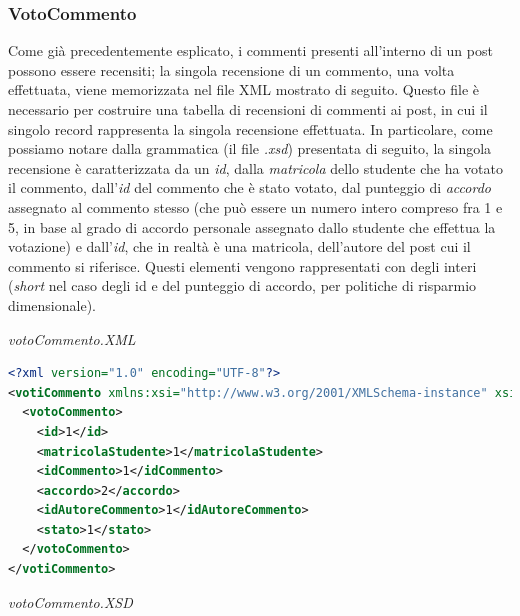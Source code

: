 \documentclass [a4paper,11pt]{book}
\begin{document}
\medskip

\subsubsection{VotoCommento}

Come già precedentemente esplicato, i commenti presenti all'interno di un post possono essere recensiti; la singola recensione di un commento, una volta effettuata, viene memorizzata nel file XML mostrato di seguito. Questo file è necessario per costruire una tabella di recensioni di commenti ai post, in cui il singolo record rappresenta la singola recensione effettuata. In particolare, come possiamo notare dalla grammatica (il file \emph{.xsd}) presentata di seguito, la singola recensione è caratterizzata da un \emph{id}, dalla \emph{matricola} dello studente che ha votato il commento, dall'\emph{id} del commento che è stato votato, dal punteggio di \emph{accordo} assegnato al commento stesso (che può essere un numero intero compreso fra 1 e 5, in base al grado di accordo personale assegnato dallo studente che effettua la votazione) e dall'\emph{id}, che in realtà è una matricola, dell'autore del post cui il commento si riferisce. Questi elementi vengono rappresentati con degli interi (\emph{short} nel caso degli id e del punteggio di accordo, per politiche di risparmio dimensionale).

\medskip

\emph{votoCommento.XML}

\label{sec:votoCommento}

\begin{lstlisting}[language=XML]
<?xml version="1.0" encoding="UTF-8"?>
<votiCommento xmlns:xsi="http://www.w3.org/2001/XMLSchema-instance" xsi:noNamespaceSchemaLocation="votoCommento.xsd">
  <votoCommento>
    <id>1</id>
    <matricolaStudente>1</matricolaStudente>
    <idCommento>1</idCommento>
    <accordo>2</accordo>
    <idAutoreCommento>1</idAutoreCommento>
    <stato>1</stato>
  </votoCommento>
</votiCommento>
\end{lstlisting}

\emph{votoCommento.XSD}
\end{document}
